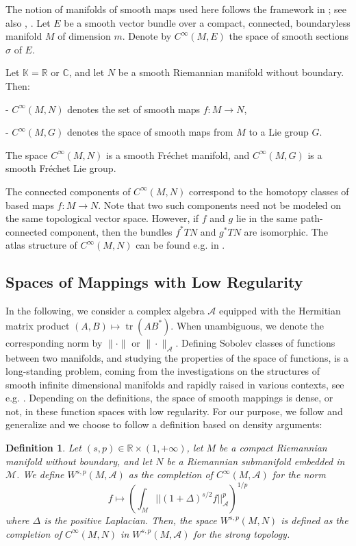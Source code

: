 \documentclass{amsart}
\def\K{{ \mathbb{K}}}
\def\R{\mathbb{R}}
\newcounter{thm}
\newcounter{ex}
\newcounter{re}
\newtheorem{Definition}[thm]{Definition}
\begin{document}
The notion of manifolds of smooth maps used here follows the framework in \cite{Ee}; see also \cite{KM}, \cite{Freed1988}. Let $E$ be a smooth vector bundle over a compact, connected, boundaryless manifold $M$ of dimension $m$. Denote by $C^\infty(M,E)$ the space of smooth sections $\sigma$ of $E$.

Let $\K = \R$ or $\mathbb{C}$, and let $N$ be a smooth Riemannian manifold without boundary. Then:

- $C^\infty(M,N)$ denotes the set of smooth maps $f: M \rightarrow N$,

- $C^\infty(M,G)$ denotes the space of smooth maps from $M$ to a Lie group $G$.

The space $C^\infty(M,N)$ is a smooth Fréchet manifold, and $C^\infty(M,G)$ is a smooth Fréchet Lie group.

The connected components of $C^\infty(M,N)$ correspond to the homotopy classes of based maps $f: M \rightarrow N$. Note that two such components need not be modeled on the same topological vector space. However, if $f$ and $g$ lie in the same path-connected component, then the bundles $f^*TN$ and $g^*TN$ are isomorphic. The atlas structure of $C^\infty(M,N)$ can be found e.g. in \cite{Ma2006}.

\subsection{Spaces of Mappings with Low Regularity}

In the following, we consider a complex algebra $\mathcal{A}$ equipped with the Hermitian matrix product $(A,B) \mapsto \operatorname{tr}(AB^*)$. When unambiguous, we denote the corresponding norm by $\| \cdot \|$ or $\| \cdot \|_{\mathcal{A}}$. {\color{black} Defining Sobolev classes of functions between two manifolds, and studying the properties of the space of functions, is a long-standing problem, coming from the investigations on the structures of smooth infinite dimensional manifolds \cite{Ee} and rapidly raised in various contexts, see e.g. \cite{BZ1988,Bet1991,BM2021,Det2025,EeL1978,Mir2017}. Depending on the definitions, the space of smooth mappings is dense, or not, in these function spaces with low regularity. For our purpose,   
we follow and generalize \cite{Ma2019,GMW2023} and we choose to follow a definition based on density arguments:}

\begin{Definition} \label{d:sobolev} Let $(s,p) \in \mathbb{R} \times (1,+\infty)$, let $M$ be a compact Riemannian manifold without boundary, and let $N$ be a Riemannian submanifold embedded in $\mathcal{M}$. {\color{black} We define $W^{s,p}(M,\mathcal{A})$ as the completion of $C^\infty(M,\mathcal{A})$ for the norm \[f \mapsto \left(\int_M || (1 + \Delta)^{s/2} f ||_\mathcal{A}^p\right)^{1/p}\] where $\Delta$ is the positive Laplacian.}
	Then, the space $W^{s,p}(M,N)$ is defined as the completion of $C^\infty(M,N)$ in $W^{s,p}(M,\mathcal{A})$ {\color{black} for the strong topology.}
\end{Definition}
\end{document}

